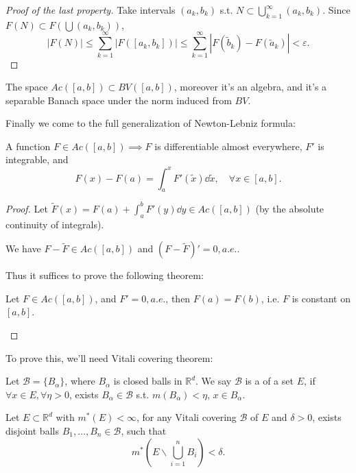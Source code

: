 \begin{proof}[Proof of the last property]
    Take intervals $(a_k,b_k)$ s.t. $N \subset \bigcup_{k=1}^\infty (a_k, b_k)$.
	Since $F(N) \subset F(\bigcup (a_k,b_k))$,
	\[
		|F(N)| \le \sum_{k=1}^{\infty} |F([a_k, b_k])|\le \sum_{k=1}^{\infty}
		|F(\tilde b_k) - F(\tilde a_k)| < \varepsilon.
	\]
\end{proof}

\begin{proposition}
	The space $Ac([a,b]) \subset BV([a,b])$, moreover it's an algebra,
	and it's a separable Banach space under the norm induced from $BV$.
\end{proposition}

Finally we come to the full generalization of Newton-Lebniz formula:
\begin{theorem}
	A function $F\in Ac([a,b]) \implies F$ is differentiable almost everywhere,
	$F'$ is integrable, and
	\[
		F(x) - F(a) = \int_{a}^{x} F'(\tilde x)\dd \tilde x, \quad \forall x\in [a,b].
	\]
\end{theorem}
\begin{proof}[Proof]
	Let $\tilde F(x) = F(a) + \int_{a}^{b} F'(y)\dd y\in Ac([a,b])$
	(by the absolute continuity of integrals).

	We have $F - \tilde F\in Ac([a,b])$ and $(F-\tilde F)' = 0, a.e.$.

	Thus it suffices to prove the following theorem:
	\begin{theorem}
		Let $F\in Ac([a,b])$, and $F'=0,a.e.$, then $F(a)=F(b)$, i.e.
		$F$ is constant on $[a,b]$.
	\end{theorem}
\end{proof}

To prove this, we'll need Vitali covering theorem:
\begin{definition}
	Let $\mathcal{B} = \{B_\alpha\}$, where $B_\alpha$ is closed balls in $\mathbb{R}^d$.
	We say $\mathcal{B}$ is a  of a set $E$,
	if  $\forall x\in E, \forall \eta > 0$, exists $B_\alpha\in \mathcal{B}$ s.t.
	$m(B_\alpha)<\eta$,  $x\in B_\alpha$.
\end{definition}

\begin{theorem}[Vitali]
	\label{thm:vitali}
    Let $E \subset \mathbb{R}^{d}$ with $m^*(E)<\infty$, for any Vitali covering
	$\mathcal{B}$ of $E$ and $\delta>0$,
	exists disjoint balls $B_1,\dots,B_n\in \mathcal{B}$,
	such that
	\[
	m^*\left(E\backslash \bigcup_{i=1}^n B_i\right) < \delta.
	\]
\end{theorem}

